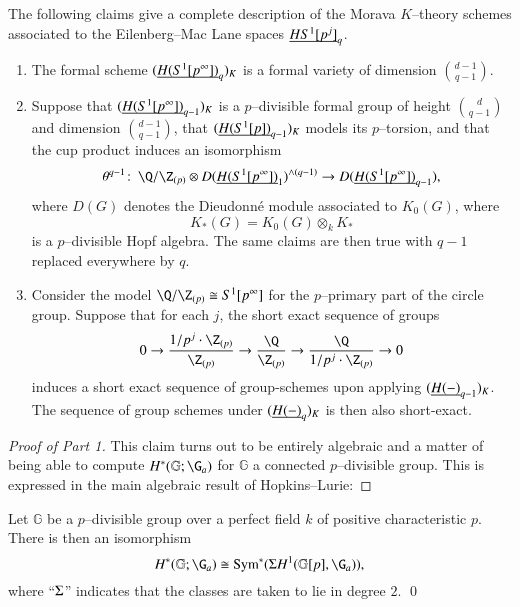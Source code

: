 \begin{theorem}\label{MainKThyOfEMSpacesTheorem}
The following claims give a complete description of the Morava $K$--theory schemes associated to the Eilenberg--Mac Lane spaces $\underline{\smash{HS^1[p^j]}}_{q}$.
\begin{enumerate}
    \item The formal scheme $(\underline{\smash{H(S^1[p^\infty])}}_{q})_K$ is a formal variety of dimension $\binom{d-1}{q-1}$.
    \item Suppose that $(\underline{\smash{H(S^1[p^\infty])}}_{q-1})_K$ is a $p$--divisible formal group of height $\binom{d}{q-1}$ and dimension $\binom{d-1}{q-1}$, that $(\underline{\smash{H(S^1[p])}}_{q-1})_K$ models its $p$--torsion, and that the cup product induces an isomorphism \[\theta^{q-1}\co \Q / \Z_{(p)} \otimes D(\OS{H(S^1[p^\infty])}{1})^{\wedge (q-1)} \to D(\OS{H(S^1[p^\infty])}{q-1}),\] where $D(G)$ denotes the Dieudonn\'e module associated to $K_0(G)$, where \[K_*(G) = K_0(G) \otimes_k K_*\] is a $p$--divisible Hopf algebra.  The same claims are then true with $q-1$ replaced everywhere by $q$.
    \item Consider the model $\Q / \Z_{(p)} \cong S^1[p^\infty]$ for the $p$--primary part of the circle group.  Suppose that for each $j$, the short exact sequence of groups \[0 \to \frac{1/p^j \cdot \Z_{(p)}}{\Z_{(p)}} \to \frac{\Q}{\Z_{(p)}} \to \frac{\Q}{1/p^j \cdot \Z_{(p)}} \to 0\] induces a short exact sequence of group-schemes upon applying $(\underline{\smash{H(-)}}_{q-1})_K$.  The sequence of group schemes under $(\underline{\smash{H(-)}}_{q})_K$ is then also short-exact.
\end{enumerate}
\end{theorem}
\begin{proof}[Proof of Part 1]\renewcommand{\qedsymbol}{\relax}
This claim turns out to be entirely algebraic and a matter of being able to compute $H^*(\mathbb G; \G_a)$ for $\mathbb G$ a connected $p$--divisible group.  This is expressed in the main algebraic result of Hopkins--Lurie:
\end{proof}

\begin{theorem}
Let $\mathbb G$ be a $p$--divisible group over a perfect field $k$ of positive characteristic $p$.  There is then an isomorphism \[H^*(\mathbb G; \G_a) \cong \Sym^*(\Susp H^1(\mathbb G[p], \G_a)),\] where ``$\Sigma$'' indicates that the classes are taken to lie in degree $2$. \qed
\end{theorem}

